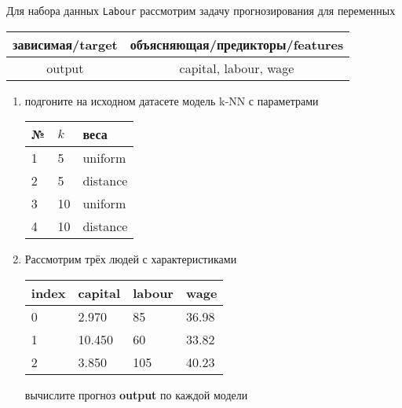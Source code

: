 \begin{exercise}
Для набора данных \texttt{Labour} рассмотрим задачу прогнозирования
для переменных
\begin{center}
	\begin{tabular}{|c|c|}\hline
		зависимая/target & объясняющая/предикторы/features \\ \hline
		output & capital, labour, wage \\ \hline
	\end{tabular}
\end{center}
\begin{enumerate}
	\item подгоните на исходном датасете модель k-NN с параметрами
	\begin{center}
		\begin{tabular}{|l|l|l|}\hline
		№ & \(k\) & веса \\ \hline
		1 & 5 & uniform \\
		2 & 5 & distance \\
		3 & 10 & uniform \\
		4 & 10 & distance \\ \hline
		\end{tabular}
	\end{center}
	\item Рассмотрим трёх людей с характеристиками
	\begin{center}
		\begin{tabular}{|l||l|l|l|}\hline
			index & capital & labour & wage \\ \hline\hline
			0 & 2.970 & 85 & 36.98\\
			1 & 10.450 & 60 & 33.82  \\
			2 & 3.850 & 105 & 40.23\\ \hline
		\end{tabular}
	\end{center}
	вычислите прогноз \textbf{output} по каждой модели
\end{enumerate}
\end{exercise}

